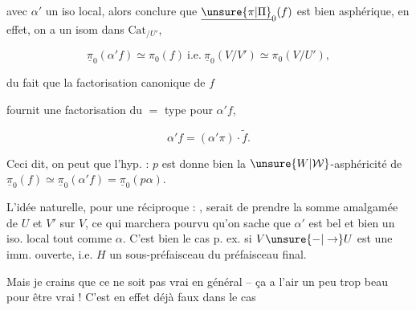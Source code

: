 

avec $\alpha'$  un iso local, alors   conclure que $\underline{\unsure{\pi|\Pi}}_0(f)$ est bien asphérique,  en effet, on a un isom  dans $\mathrm{Cat}_{/U'}$,

\[
\underline{\pi}_0(\alpha'f)\simeq\pi_0(f)\ \text{i.e.}\ \underline{\pi}_0(V/V')\simeq\pi_0(V/U'),
\]

du fait  que la factorisation canonique de $f$


fournit une factorisation du $=$ type pour $\alpha'f$, 

\[
\alpha'f=(\alpha'\pi)\cdot\widetilde f.
\]

Ceci dit, on peut  que l'hyp. : $p$ est  donne bien la $\unsure{W|\mathcal W}$-asphéricité de $\underline{\pi}_0(f)\simeq\underline{\pi}_0(\alpha'f)=\underline{\pi}_0(p\alpha)$.

L'idée naturelle, pour une réciproque : , serait de prendre  la somme amalgamée de $U$ et $V'$ sur $V$, ce qui  marchera pourvu qu'on sache que $\alpha'$ est bel et bien un iso. local tout comme $\alpha$. C'est bien le cas p. ex. si $V\unsure{-|\to}U$ est une imm. ouverte, i.e. $H$ un sous-préfaisceau du préfaisceau final.

Mais je crains que ce ne soit pas vrai en général -- ça a l'air un peu trop beau pour être vrai ! C'est en effet déjà faux dans le cas


